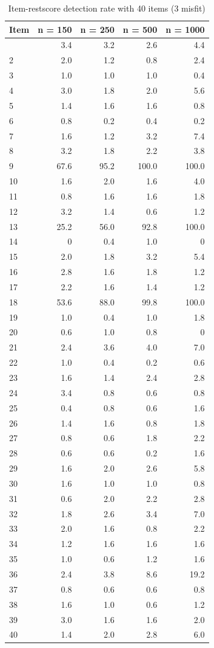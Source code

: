 \documentclass[
  letterpaper,
  DIV=11,
  numbers=noendperiod]{scrartcl}
\begin{document}
\begin{longtable}[]{@{}lrrrr@{}}

\caption{\label{tbl-itemrestscore40}Item-restscore detection rate with
40 items (3 misfit)}

\tabularnewline

\toprule\noalign{}
Item & n = 150 & n = 250 & n = 500 & n = 1000 \\
\midrule\noalign{}
\endhead
\bottomrule\noalign{}
\endlastfoot
1 & 3.4 & 3.2 & 2.6 & 4.4 \\
2 & 2.0 & 1.2 & 0.8 & 2.4 \\
3 & 1.0 & 1.0 & 1.0 & 0.4 \\
4 & 3.0 & 1.8 & 2.0 & 5.6 \\
5 & 1.4 & 1.6 & 1.6 & 0.8 \\
6 & 0.8 & 0.2 & 0.4 & 0.2 \\
7 & 1.6 & 1.2 & 3.2 & 7.4 \\
8 & 3.2 & 1.8 & 2.2 & 3.8 \\
9 & 67.6 & 95.2 & 100.0 & 100.0 \\
10 & 1.6 & 2.0 & 1.6 & 4.0 \\
11 & 0.8 & 1.6 & 1.6 & 1.8 \\
12 & 3.2 & 1.4 & 0.6 & 1.2 \\
13 & 25.2 & 56.0 & 92.8 & 100.0 \\
14 & 0 & 0.4 & 1.0 & 0 \\
15 & 2.0 & 1.8 & 3.2 & 5.4 \\
16 & 2.8 & 1.6 & 1.8 & 1.2 \\
17 & 2.2 & 1.6 & 1.4 & 1.2 \\
18 & 53.6 & 88.0 & 99.8 & 100.0 \\
19 & 1.0 & 0.4 & 1.0 & 1.8 \\
20 & 0.6 & 1.0 & 0.8 & 0 \\
21 & 2.4 & 3.6 & 4.0 & 7.0 \\
22 & 1.0 & 0.4 & 0.2 & 0.6 \\
23 & 1.6 & 1.4 & 2.4 & 2.8 \\
24 & 3.4 & 0.8 & 0.6 & 0.8 \\
25 & 0.4 & 0.8 & 0.6 & 1.6 \\
26 & 1.4 & 1.6 & 0.8 & 1.8 \\
27 & 0.8 & 0.6 & 1.8 & 2.2 \\
28 & 0.6 & 0.6 & 0.2 & 1.6 \\
29 & 1.6 & 2.0 & 2.6 & 5.8 \\
30 & 1.6 & 1.0 & 1.0 & 0.8 \\
31 & 0.6 & 2.0 & 2.2 & 2.8 \\
32 & 1.8 & 2.6 & 3.4 & 7.0 \\
33 & 2.0 & 1.6 & 0.8 & 2.2 \\
34 & 1.2 & 1.6 & 1.6 & 1.6 \\
35 & 1.0 & 0.6 & 1.2 & 1.6 \\
36 & 2.4 & 3.8 & 8.6 & 19.2 \\
37 & 0.8 & 0.6 & 0.6 & 0.8 \\
38 & 1.6 & 1.0 & 0.6 & 1.2 \\
39 & 3.0 & 1.6 & 1.6 & 2.0 \\
40 & 1.4 & 2.0 & 2.8 & 6.0 \\


\end{longtable}
\end{document}
